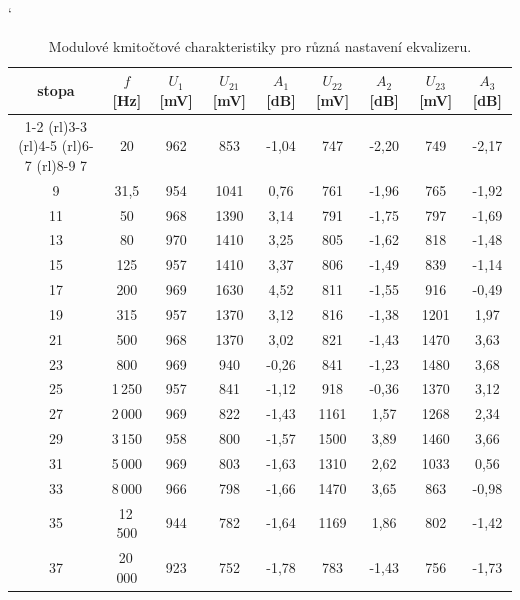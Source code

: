 \documentclass[a4paper, czech]{article}
\begin{document}
\begin{table}[H]
    \centering
    \catcode`
    \caption{Modulové kmitočtové charakteristiky pro různá nastavení ekvalizeru.}
    \begin{tabular}{ccccccccc}
        \toprule
        \textbf{stopa} & \textbf{$f$ [Hz]} & \textbf{$U_1$ [mV]} & \textbf{$U_{21}$ [mV]} & \textbf{$A_1$ [dB]} & \textbf{$U_{22}$ [mV]} & \textbf{$A_2$ [dB]} & \textbf{$U_{23}$ [mV]} & \textbf{$A_3$ [dB]} \\
        \cmidrule(rl){1-2}
        \cmidrule(rl){3-3}
        \cmidrule(rl){4-5}
        \cmidrule(rl){6-7}
        \cmidrule(rl){8-9}
        7     & 20     & 962     & 853      & -1,04   & 747      & -2,20   & 749      & -2,17   \\
        9     & 31,5   & 954     & 1041     & 0,76    & 761      & -1,96   & 765      & -1,92   \\
        11    & 50     & 968     & 1390     & 3,14    & 791      & -1,75   & 797      & -1,69   \\
        13    & 80     & 970     & 1410     & 3,25    & 805      & -1,62   & 818      & -1,48   \\
        15    & 125    & 957     & 1410     & 3,37    & 806      & -1,49   & 839      & -1,14   \\
        17    & 200    & 969     & 1630     & 4,52    & 811      & -1,55   & 916      & -0,49   \\
        19    & 315    & 957     & 1370     & 3,12    & 816      & -1,38   & 1201     & 1,97    \\
        21    & 500    & 968     & 1370     & 3,02    & 821      & -1,43   & 1470     & 3,63    \\
        23    & 800    & 969     & 940      & -0,26   & 841      & -1,23   & 1480     & 3,68    \\
        25    & 1\,250   & 957     & 841      & -1,12   & 918      & -0,36   & 1370     & 3,12    \\
        27    & 2\,000   & 969     & 822      & -1,43   & 1161     & 1,57    & 1268     & 2,34    \\
        29    & 3\,150   & 958     & 800      & -1,57   & 1500     & 3,89    & 1460     & 3,66    \\
        31    & 5\,000   & 969     & 803      & -1,63   & 1310     & 2,62    & 1033     & 0,56    \\
        33    & 8\,000   & 966     & 798      & -1,66   & 1470     & 3,65    & 863      & -0,98   \\
        35    & 12\,500  & 944     & 782      & -1,64   & 1169     & 1,86    & 802      & -1,42   \\
        37    & 20\,000  & 923     & 752      & -1,78   & 783      & -1,43   & 756      & -1,73  \\
        \bottomrule
    \end{tabular}
\end{table}
\end{document}
